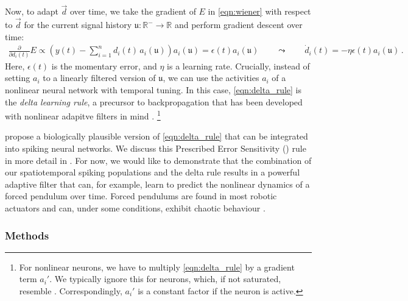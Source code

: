 Now, to adapt $\vec d$ over time, we take the gradient of $E$ in \cref{eqn:wiener} with respect to $\vec d$ for the current signal history $\mathfrak{u} : \mathbb{R}^- \longrightarrow \mathbb{R}$ and perform gradient descent over time:
\begin{align}
	\frac{\partial}{\partial d_i(t)} E \propto \left(y(t) - \sum\nolimits_{i = 1}^n d_i(t) \, a_i(\mathfrak{u}) \right) a_i(\mathfrak{u}) = \epsilon(t) a_i(\mathfrak{u}) \quad\quad \leadsto \quad\quad \dot{d}_i(t) = - \eta \epsilon(t) a_i(\mathfrak{u}) \,.
	\label{eqn:delta_rule}
\end{align}
Here, $\epsilon(t)$ is the momentary error, and $\eta$ is a learning rate.
Crucially, instead of setting $a_i$ to a linearly filtered version of $\mathfrak{u}$, we can use the activities $a_i$ of a nonlinear neural network with temporal tuning.
In this case, \cref{eqn:delta_rule} is the \emph{delta learning rule}, a precursor to back\-pro\-pa\-ga\-tion that has been developed with nonlinear adapitve filters in mind \citep{widrow1960adaptive}.%
\footnote{For nonlinear neurons, we have to multiply \cref{eqn:delta_rule} by a gradient term $a_i'$. We typically ignore this for \LIF neurons, which, if not saturated, resemble \ReLUpl. Correspondingly, $a_i'$ is a constant factor if the neuron is active.}

 propose a biologically plausible version of \cref{eqn:delta_rule} that can be integrated into spiking neural networks.
We discuss this Prescribed Error Sensitivity (\PES) rule in more detail in .
For now, we would like to demonstrate that the combination of our spatiotemporal spiking \NEF populations and the delta rule results in a powerful adaptive filter that can, for example, learn to predict the nonlinear dynamics of a forced pendulum over time.
Forced pendulums are found in most robotic actuators and can, under some conditions, exhibit chaotic behaviour \citep{hubbard1999forced}.

\subsubsection{Methods}

